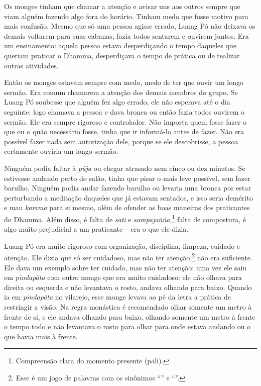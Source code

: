 Os monges tinham que chamar a atenção e avisar uns aos outros sempre que
viam alguém fazendo algo fora do horário. Tinham medo que fosse motivo
para mais confusão. Mesmo que só uma pessoa agisse errado, Luang Pó não
deixava os demais voltarem para suas cabanas, fazia todos sentarem e
ouvirem juntos. Era um ensinamento: aquela pessoa estava desperdiçando o
tempo daqueles que queriam praticar o Dhamma, desperdiçava o tempo de
prática ou de realizar outras atividades.

Então os monges estavam sempre com medo, medo de ter que ouvir um longo
sermão. Era comum chamarem a atenção dos demais membros do grupo. Se
Luang Pó soubesse que alguém fez algo errado, ele não esperava até o dia
seguinte: logo chamava a pessoa e dava bronca ou então fazia todos
ouvirem o sermão. Ele era sempre rigoroso e controlador. Não importa
quem fosse fazer o que ou o quão necessário fosse, tinha que ir
informá-lo antes de fazer. Não era possível fazer nada sem autorização
dele, porque se ele descobrisse, a pessoa certamente ouviria um longo
sermão.

Ninguém podia faltar à \emph{pūja} ou chegar atrasado nem cinco ou dez
minutos. Se estivesse andando perto do salão, tinha que pisar o mais
leve possível, sem fazer barulho. Ninguém podia andar fazendo barulho ou
levaria uma bronca por estar perturbando a meditação daqueles que já
estavam sentados, e isso seria demérito e mau \emph{kamma} para si
mesmo, além de ofender as boas maneiras dos praticantes do Dhamma. Além
disso, é falta de \emph{sati} e \emph{sampajañña},\footnote{Compreensão
  clara do momento presente (pāli).} falta de compostura, é algo muito
prejudicial a um praticante -- era o que ele dizia.

Luang Pó era muito rigoroso com organização, disciplina, limpeza,
cuidado e atenção. Ele dizia que só ser cuidadoso, mas não ter
\mbox{atenção},\footnote{Esse é um jogo de palavras com os sinônimos ``'' e
  ``''.} não era suficiente. Ele dava um exemplo sobre ter cuidado,
mas não ter atenção: uma vez ele saiu em \emph{pindapāta} com outro
monge que era muito cuidadoso: ele não olhava para direita ou esquerda e
não levantava o rosto, andava olhando para baixo. Quando ia em
\emph{pindapāta} no vilarejo, esse monge levava ao pé da letra a prática
de restringir a visão. Na regra monástica é recomendado olhar somente um
metro à frente de si, e ele andava olhando para baixo, olhando somente
um metro à frente o tempo todo e não levantava o rosto para olhar para
onde estava andando ou o que havia mais à frente.

